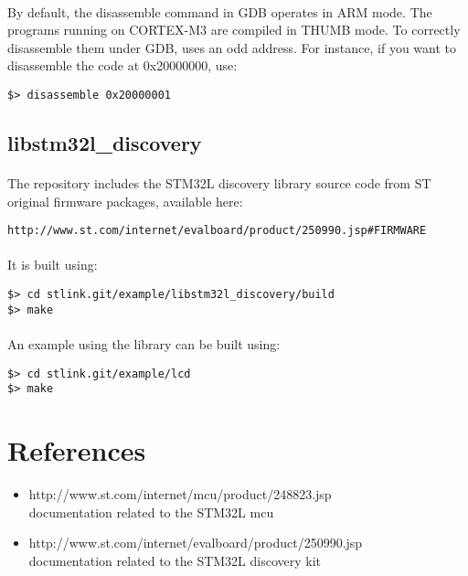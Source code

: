 \documentclass[a4paper, 11pt]{article}
\begin{document}
\paragraph{}
By default, the disassemble command in GDB operates in ARM mode. The programs running on CORTEX-M3
are compiled in THUMB mode. To correctly disassemble them under GDB, uses an odd address. For instance,
if you want to disassemble the code at 0x20000000, use:\\
\begin{small}
\begin{lstlisting}[frame=tb]
$> disassemble 0x20000001
\end{lstlisting}
\end{small}


\subsection{libstm32l\_discovery}
\paragraph{}
The repository includes the STM32L discovery library source code from ST original firmware packages,
available here:\\
\begin{small}
\begin{lstlisting}[frame=tb]
http://www.st.com/internet/evalboard/product/250990.jsp#FIRMWARE
\end{lstlisting}
\end{small}

\paragraph{}
It is built using:\\
\begin{small}
\begin{lstlisting}[frame=tb]
$> cd stlink.git/example/libstm32l_discovery/build
$> make
\end{lstlisting}
\end{small}

\paragraph{}
An example using the library can be built using:\\
\begin{small}
\begin{lstlisting}[frame=tb]
$> cd stlink.git/example/lcd
$> make
\end{lstlisting}
\end{small}


\newpage
\section{References}
\begin{itemize}
\item http://www.st.com/internet/mcu/product/248823.jsp\\
  documentation related to the STM32L mcu
\item http://www.st.com/internet/evalboard/product/250990.jsp\\
  documentation related to the STM32L discovery kit
\end{itemize}
\end{document}
